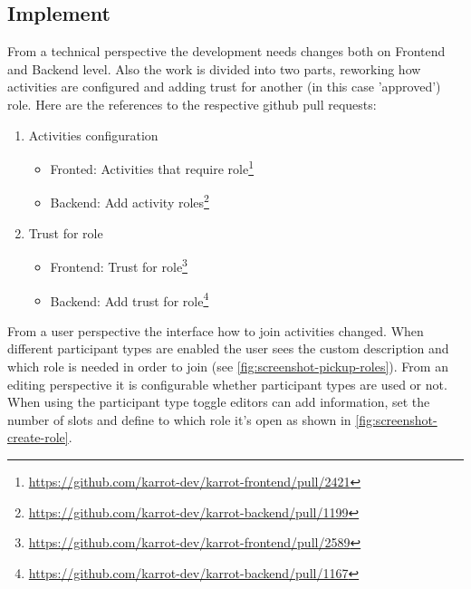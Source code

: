 \documentclass[
	a4paper,%
	11pt,%
	]{article}
\begin{document}
 
\subsection{Implement}

From a technical perspective the development needs changes both on Frontend and Backend level. Also the work is divided into two parts, reworking how activities are configured and adding trust for another (in this case 'approved') role. Here are the references to the respective github pull requests:
\begin{enumerate}
    \item Activities configuration
    \begin{itemize}
    		\item Fronted: Activities that require role\footnote{\label{url_github_2421}\url{https://github.com/karrot-dev/karrot-frontend/pull/2421}}
    		\item Backend: Add activity roles\footnote{\label{url_github_1199}\url{https://github.com/karrot-dev/karrot-backend/pull/1199}}    
    \end{itemize}
    \item Trust for role
    \begin{itemize}
    		\item Frontend: Trust for role\footnote{\label{url_github_2589}\url{https://github.com/karrot-dev/karrot-frontend/pull/2589}}
    		\item Backend: Add trust for role\footnote{\label{url_github_1167}\url{https://github.com/karrot-dev/karrot-backend/pull/1167}}
    \end{itemize}
\end{enumerate}

From a user perspective the interface how to join activities changed. When different participant types are enabled the user sees the custom description and which role is needed in order to join (see \autoref{fig:screenshot-pickup-roles}). From an editing perspective it is configurable whether participant types are used or not. When using the participant type toggle editors can add information, set the number of slots and define to which role it's open as shown in \autoref{fig:screenshot-create-role}.
\end{document}
